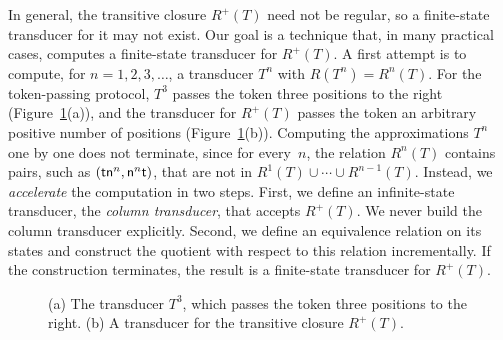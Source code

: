 In general, the transitive closure $R^+(T)$ need not be regular, so a
finite-state transducer for it may not exist. Our goal is a technique that, in
many practical cases, computes a finite-state transducer for $R^+(T)$. A first
attempt is to compute, for $n = 1, 2, 3, \ldots$, a transducer $T^n$ with
$R(T^n) = R^n(T)$. For the token-passing protocol, $T^3$ passes the token
three positions to the right (Figure~\ref{fig:closures}(a)), and the
transducer for $R^+(T)$ passes the token an arbitrary positive number of
positions (Figure~\ref{fig:closures}(b)). Computing the approximations $T^n$
one by one does not terminate, since for every~$n$, the relation $R^n(T)$
contains pairs, such as $(\mathsf{t}\mathsf{n}^n, \mathsf{n}^n\mathsf{t})$, that are not in
$R^1(T) \cup \cdots \cup R^{n-1}(T)$. Instead, we
\emph{accelerate} the computation in two steps. First, we define an
infinite-state transducer, the \emph{column transducer}, that accepts
$R^+(T)$. We never build the column transducer explicitly. Second, we define
an equivalence relation on its states and construct the quotient with respect
to this relation incrementally. If the construction terminates, the result is
a finite-state transducer for $R^+(T)$.

\begin{figure}[t]
\centering
{}

\vspace{1ex}
\caption{(a) The transducer $T^3$, which passes the token three positions to
the right. (b) A transducer for the transitive closure $R^+(T)$.}
\label{fig:closures}
\end{figure}

